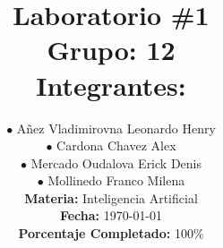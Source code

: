 
\newcommand{\NumeroLaboratorio}{1}		%
\newcommand{\PorcentajeCompletado}{100}	%





\title{
\hspace{-0.1cm}\LARGE{Laboratorio \#\NumeroLaboratorio} \\\vspace{0.05cm}
{\large Grupo: 12} \\\vspace{0.2cm}
{\large Integrantes:} \\\vspace{0.2cm}
}

\author{
\hspace{0.5cm}$\bullet$ Añez Vladimirovna Leonardo Henry\\
\hspace{0.5cm}$\bullet$ Cardona Chavez Alex\\
\hspace{0.5cm}$\bullet$ Mercado Oudalova Erick Denis\\
\hspace{0.5cm}$\bullet$ Mollinedo Franco Milena \\\vspace{0.2cm}
\textbf{Materia:} Inteligencia Artificial \\\vspace{0.2cm}
\textbf{Fecha:} \today \\\vspace{0.2cm}
\textbf{Porcentaje Completado:} \PorcentajeCompletado$\%$
}
\maketitle